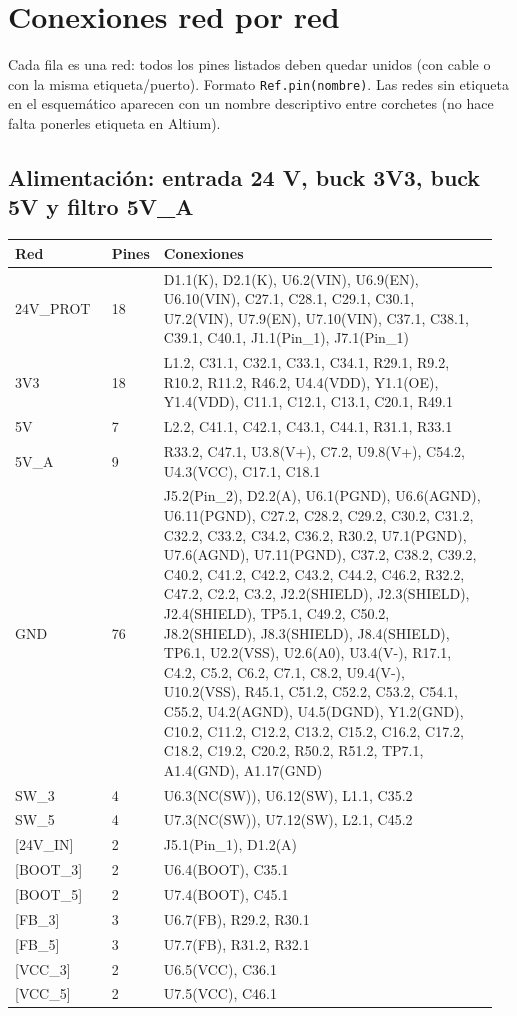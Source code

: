 \documentclass[10pt,a4paper]{article}
\begin{document}
\section{Conexiones red por red}
Cada fila es una red: todos los pines listados deben quedar unidos (con cable o con la misma
etiqueta/puerto). Formato \texttt{Ref.pin(nombre)}. Las redes sin etiqueta en el esquemático aparecen con
un nombre descriptivo entre corchetes (no hace falta ponerles etiqueta en Altium).
\subsection*{Alimentación: entrada 24 V, buck 3V3, buck 5V y filtro 5V\_A}
{\footnotesize\begin{longtable}{@{}L{0.2\linewidth}L{0.06\linewidth}L{0.7\linewidth}@{}}\toprule
\textbf{Red} & \textbf{Pines} & \textbf{Conexiones}\\\midrule\endhead
24V\_\allowbreak{}PROT & 18 & D1.1(K), D2.1(K), U6.2(VIN), U6.9(EN), U6.10(VIN), C27.1, C28.1, C29.1, C30.1, U7.2(VIN), U7.9(EN), U7.10(VIN), C37.1, C38.1, C39.1, C40.1, J1.1(Pin\_\allowbreak{}1), J7.1(Pin\_\allowbreak{}1)\\
3V3 & 18 & L1.2, C31.1, C32.1, C33.1, C34.1, R29.1, R9.2, R10.2, R11.2, R46.2, U4.4(VDD), Y1.1(OE), Y1.4(VDD), C11.1, C12.1, C13.1, C20.1, R49.1\\
5V & 7 & L2.2, C41.1, C42.1, C43.1, C44.1, R31.1, R33.1\\
5V\_\allowbreak{}A & 9 & R33.2, C47.1, U3.8(V+), C7.2, U9.8(V+), C54.2, U4.3(VCC), C17.1, C18.1\\
GND & 76 & J5.2(Pin\_\allowbreak{}2), D2.2(A), U6.1(PGND), U6.6(AGND), U6.11(PGND), C27.2, C28.2, C29.2, C30.2, C31.2, C32.2, C33.2, C34.2, C36.2, R30.2, U7.1(PGND), U7.6(AGND), U7.11(PGND), C37.2, C38.2, C39.2, C40.2, C41.2, C42.2, C43.2, C44.2, C46.2, R32.2, C47.2, C2.2, C3.2, J2.2(SHIELD), J2.3(SHIELD), J2.4(SHIELD), TP5.1, C49.2, C50.2, J8.2(SHIELD), J8.3(SHIELD), J8.4(SHIELD), TP6.1, U2.2(VSS), U2.6(A0), U3.4(V-), R17.1, C4.2, C5.2, C6.2, C7.1, C8.2, U9.4(V-), U10.2(VSS), R45.1, C51.2, C52.2, C53.2, C54.1, C55.2, U4.2(AGND), U4.5(DGND), Y1.2(GND), C10.2, C11.2, C12.2, C13.2, C15.2, C16.2, C17.2, C18.2, C19.2, C20.2, R50.2, R51.2, TP7.1, A1.4(GND), A1.17(GND)\\
SW\_\allowbreak{}3 & 4 & U6.3(NC(SW)), U6.12(SW), L1.1, C35.2\\
SW\_\allowbreak{}5 & 4 & U7.3(NC(SW)), U7.12(SW), L2.1, C45.2\\
{[}24V\_\allowbreak{}IN{]} & 2 & J5.1(Pin\_\allowbreak{}1), D1.2(A)\\
{[}BOOT\_\allowbreak{}3{]} & 2 & U6.4(BOOT), C35.1\\
{[}BOOT\_\allowbreak{}5{]} & 2 & U7.4(BOOT), C45.1\\
{[}FB\_\allowbreak{}3{]} & 3 & U6.7(FB), R29.2, R30.1\\
{[}FB\_\allowbreak{}5{]} & 3 & U7.7(FB), R31.2, R32.1\\
{[}VCC\_\allowbreak{}3{]} & 2 & U6.5(VCC), C36.1\\
{[}VCC\_\allowbreak{}5{]} & 2 & U7.5(VCC), C46.1\\
\bottomrule\end{longtable}}
\end{document}
